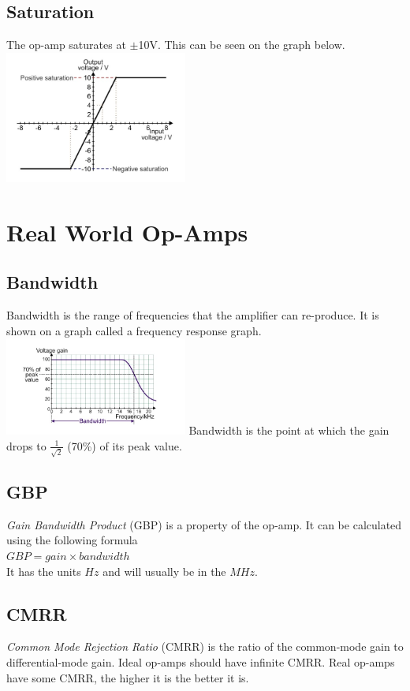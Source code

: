 \documentclass[a4paper,11pt, twocolumn]{article}
\begin{document}
\subsection{Saturation}
The op-amp saturates at $\pm$10V. This can be seen on the graph below.
\includegraphics[width=0.45\textwidth]{nonAmp-2.jpg}

\section{Real World Op-Amps}
\subsection{Bandwidth}
Bandwidth is the range of frequencies that the amplifier can re-produce. It is shown on a graph called a frequency response graph.
\includegraphics[width=0.45\textwidth]{freqResp.jpg}
Bandwidth is the point at which the gain drops to $\frac{1}{\sqrt{2}}$ (70\%) of its peak value. 
\subsection{GBP}
\textit{Gain Bandwidth Product} (GBP) is a property of the op-amp. It can be calculated using the following formula\\
$GBP = gain \times bandwidth$\\
It has the units $Hz$ and will usually be in the $MHz$. 
\subsection{CMRR}
\textit{Common Mode Rejection Ratio} (CMRR) is the ratio of the common-mode gain to differential-mode gain. Ideal op-amps should have infinite CMRR. Real op-amps have some CMRR, the higher it is the better it is. 
\end{document}
